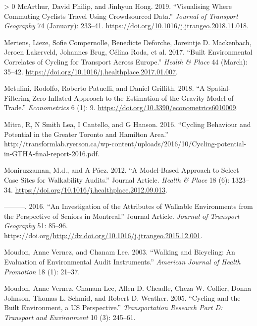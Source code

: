 \documentclass[smallextended]{svjour3}       %
\newlength{\cslhangindent}
\newenvironment{CSLReferences}[3] %
 {%
  \setlength{\parindent}{0pt}
  \ifodd #1 \everypar{\setlength{\hangindent}{\cslhangindent}}\ignorespaces\fi
  \ifnum #2 > 0
  \setlength{\parskip}{#2\baselineskip}
  \fi
 }%
 {}
\begin{document}
\begin{CSLReferences}{1}{0}
\leavevmode\hypertarget{ref-McArthur2019}{}%
McArthur, David Philip, and Jinhyun Hong. 2019. {``Visualising Where
Commuting Cyclists Travel Using Crowdsourced Data.''} \emph{Journal of
Transport Geography} 74 (January): 233--41.
\url{https://doi.org/10.1016/j.jtrangeo.2018.11.018}.

\leavevmode\hypertarget{ref-Mertens2017}{}%
Mertens, Lieze, Sofie Compernolle, Benedicte Deforche, Joreintje D.
Mackenbach, Jeroen Lakerveld, Johannes Brug, Célina Roda, et al. 2017.
{``Built Environmental Correlates of Cycling for Transport Across
{Europe}.''} \emph{Health \& Place} 44 (March): 35--42.
\url{https://doi.org/10.1016/j.healthplace.2017.01.007}.

\leavevmode\hypertarget{ref-Metulini2018}{}%
Metulini, Rodolfo, Roberto Patuelli, and Daniel Griffith. 2018. {``A
{Spatial}-{Filtering Zero}-{Inflated Approach} to the {Estimation} of
the {Gravity Model} of {Trade}.''} \emph{Econometrics} 6 (1): 9.
\url{https://doi.org/10.3390/econometrics6010009}.

\leavevmode\hypertarget{ref-Mitra2016}{}%
Mitra, R, N Smith Lea, I Cantello, and G Hanson. 2016. {``Cycling
Behaviour and Potential in the Greater Toronto and Hamilton Area.''}
http://transformlab.ryerson.ca/wp-content/uploads/2016/10/Cycling-potential-in-GTHA-final-report-2016.pdf.

\leavevmode\hypertarget{ref-Moniruzzaman2012}{}%
Moniruzzaman, M.d., and A Páez. 2012. {``A Model-Based Approach to
Select Case Sites for Walkability Audits.''} Journal Article.
\emph{Health \& Place} 18 (6): 1323--34.
\url{https://doi.org/10.1016/j.healthplace.2012.09.013}.

\leavevmode\hypertarget{ref-Moniruzzaman2016}{}%
---------. 2016. {``An Investigation of the Attributes of Walkable
Environments from the Perspective of Seniors in {Montreal}.''} Journal
Article. \emph{Journal of Transport Geography} 51: 85--96.
https://doi.org/\url{http://dx.doi.org/10.1016/j.jtrangeo.2015.12.001}.

\leavevmode\hypertarget{ref-Moudon2003walking}{}%
Moudon, Anne Vernez, and Chanam Lee. 2003. {``Walking and Bicycling: An
Evaluation of Environmental Audit Instruments.''} \emph{American Journal
of Health Promotion} 18 (1): 21--37.

\leavevmode\hypertarget{ref-moudonCyclingBuiltEnvironment2005a}{}%
Moudon, Anne Vernez, Chanam Lee, Allen D. Cheadle, Cheza W. Collier,
Donna Johnson, Thomas L. Schmid, and Robert D. Weather. 2005. {``Cycling
and the Built Environment, a {US} Perspective.''} \emph{Transportation
Research Part D: Transport and Environment} 10 (3): 245--61.


\end{CSLReferences}
\end{document}
